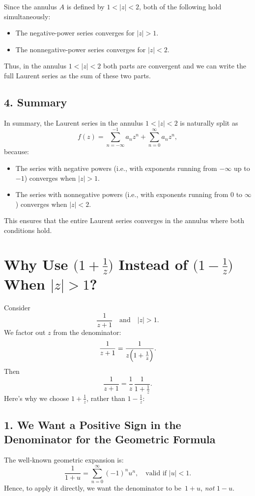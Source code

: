\documentclass[12pt]{article}
\theoremstyle{definition} %
\theoremstyle{plain} %
\begin{document}
Since the annulus \(A\) is defined by \(1<|z|<2\), both of the following hold simultaneously:
\begin{itemize}
  \item The negative-power series converges for \(|z|>1\).
  \item The nonnegative-power series converges for \(|z|<2\).
\end{itemize}
Thus, in the annulus \(1<|z|<2\) both parts are convergent and we can write the full Laurent series as the sum of these two parts.

\subsection*{4. Summary}

In summary, the Laurent series in the annulus \(1<|z|<2\) is naturally split as
\[
f(z) = \sum_{n=-\infty}^{-1} a_n z^n + \sum_{n=0}^{\infty} a_n z^n,
\]
because:
\begin{itemize}
  \item The series with negative powers (i.e., with exponents running from \(-\infty\) up to \(-1\)) converges when \(|z|>1\).
  \item The series with nonnegative powers (i.e., with exponents running from \(0\) to \(\infty\)) converges when \(|z|<2\).
\end{itemize}
This ensures that the entire Laurent series converges in the annulus where both conditions hold.
\section*{Why Use \(\bigl(1 + \tfrac{1}{z}\bigr)\) Instead of \(\bigl(1 - \tfrac{1}{z}\bigr)\) When \(|z|>1\)?}

Consider
\[
\frac{1}{z + 1}
\quad\text{and}\quad |z| > 1.
\]
We factor out \(z\) from the denominator:
\[
\frac{1}{z + 1}
= \frac{1}{z \Bigl(1 + \frac{1}{z}\Bigr)}.
\]
Then
\[
\frac{1}{z + 1}
= \frac{1}{z} \,\frac{1}{1 + \frac{1}{z}}.
\]
Here’s why we choose \(1 + \tfrac{1}{z}\), rather than \(1 - \tfrac{1}{z}\):

\subsection*{1. We Want a Positive Sign in the Denominator for the Geometric Formula}

The well‐known geometric expansion is:
\[
\frac{1}{1+u}
= \sum_{n=0}^\infty (-1)^n u^n, 
\quad \text{valid if } |u|<1.
\]
Hence, to apply it directly, we want the denominator to be \(\,1 + u\), \emph{not} \(1 - u\). 
\end{document}
